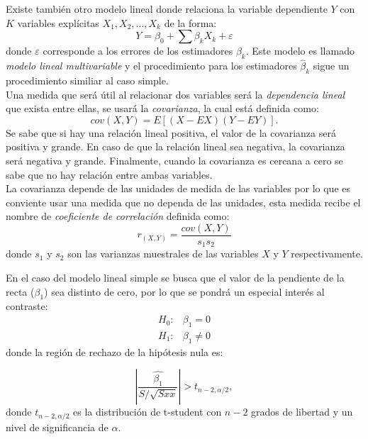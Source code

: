 Existe también otro modelo lineal donde relaciona la variable dependiente $Y$ con $K$ variables explícitas $X_1, X_2, \ldots, X_k$ de la forma:
\begin{equation}
	Y=\beta_0+\sum \beta_k X_k +\varepsilon
\end{equation}
donde $\varepsilon$ corresponde a los errores de los estimadores $\beta_k$.  Este modelo es llamado \emph{modelo lineal multivariable} y el procedimiento para los estimadores $\hat{\beta}_k$ sigue un procedimiento similiar al caso simple. \\

\noindent Una medida que será útil al relacionar dos variables será la  \emph{dependencia lineal} que exista entre ellas, se usará la \emph{covarianza}, la cual está definida como:
\begin{equation}
cov(X,Y)=E[(X-EX)(Y-EY)].
\end{equation}
Se sabe que si hay una relación lineal positiva, el valor de la covarianza será positiva y grande. En caso de que la relación lineal sea negativa, la covarianza será negativa y grande. Finalmente, cuando la covarianza es cercana a cero se sabe que no hay relación entre ambas variables.\\

La covarianza depende de las unidades de medida de las variables por lo que es conviente usar una medida que no dependa de las unidades, esta medida recibe el nombre de  \emph{coeficiente de correlación} definida como:
\begin{equation}
	r_{(X,Y)}=\frac{cov(X,Y)}{s_1s_2}
\end{equation}
donde $s_1$ y $s_2$ son las varianzas muestrales de las variables $X$ y $Y$ respectivamente.

En el caso del modelo lineal simple se busca que el valor de la pendiente de la recta  ($\beta_1$) sea distinto de cero, por lo que se pondrá un especial interés al contraste:
\begin{eqnarray}
	H_0: & \beta_1=0\\
	 H_1: & \beta_1\neq 0
\end{eqnarray}
donde la región de rechazo de la hipótesis nula es:
 
 \begin{equation}
\left|\frac{\hat{\beta_1}}{S/\sqrt{S{xx}}}\right| > t_{n-2,\alpha/2},
\end{equation}
donde $t_{n-2,\alpha/2}$ es la distribución de t-student con $n-2$ grados de libertad y un nivel de significancia de $\alpha$.

